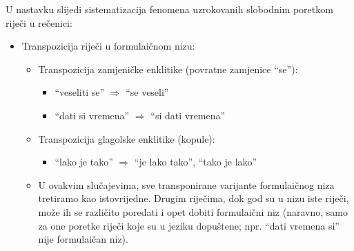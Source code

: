 \documentclass[12pt]{article}
\begin{document}
U nastavku slijedi sistematizacija fenomena uzrokovanih slobodnim poretkom riječi u rečenici:

\begin{itemize}

\item Transpozicija riječi u formulaičnom nizu:
\begin{itemize}
\item Transpozicija zamjeničke enklitike (povratne zamjenice ``se''):
\begin{itemize}
\item ``veseliti se'' $\Rightarrow$ ``se veseli''
\item  ``dati si vremena'' $\Rightarrow$ ``si dati vremena''
\end{itemize}
\item Transpozicija glagolske enklitike (kopule):
\begin{itemize}
\item ``lako je tako'' $\Rightarrow$ ``je lako tako'', ``tako je lako''
\end{itemize}
\item U ovakvim slučajevima, sve transponirane varijante formulaičnog niza tretiramo kao
istovrijedne. Drugim riječima, dok god su u nizu iste riječi, može ih se različito poredati i opet
dobiti formulaični niz (naravno, samo za one poretke riječi koje su u jeziku dopuštene; npr.
``dati vremena si'' nije formulaičan niz).
\end{itemize}


\end{itemize}
\end{document}
